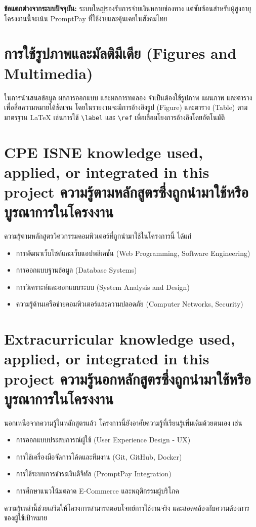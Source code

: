 \textbf{ข้อแตกต่างจากระบบปัจจุบัน:}  
ระบบใหญ่รองรับการจ่ายเงินหลายช่องทาง แต่ซับซ้อนสำหรับผู้สูงอายุ 
โครงงานนี้จะเน้น PromptPay ที่ใช้ง่ายและคุ้นเคยในสังคมไทย

\section{การใช้รูปภาพและมัลติมีเดีย (Figures and Multimedia)}
ในการนำเสนอข้อมูล ผลการออกแบบ และผลการทดลอง \cite{pressman2014} 
จำเป็นต้องใช้รูปภาพ แผนภาพ และตาราง เพื่อสื่อความหมายได้ชัดเจน 
โดยในรายงานจะมีการอ้างอิงรูป (Figure) และตาราง (Table) ตามมาตรฐาน {\LaTeX} 
เช่นการใช้ \verb.\label. และ \verb.\ref. เพื่อเชื่อมโยงการอ้างอิงโดยอัตโนมัติ

\section{\ifenglish%
\ifcpe CPE \else ISNE \fi knowledge used, applied, or integrated in this project
\else%
ความรู้ตามหลักสูตรซึ่งถูกนำมาใช้หรือบูรณาการในโครงงาน
\fi
}
ความรู้ตามหลักสูตรวิศวกรรมคอมพิวเตอร์ที่ถูกนำมาใช้ในโครงการนี้ ได้แก่
\begin{itemize}
    \item การพัฒนาเว็บไซต์และเว็บแอปพลิเคชัน (Web Programming, Software Engineering) \cite{pressman2014}
    \item การออกแบบฐานข้อมูล (Database Systems)
    \item การวิเคราะห์และออกแบบระบบ (System Analysis and Design)
    \item ความรู้ด้านเครือข่ายคอมพิวเตอร์และความปลอดภัย (Computer Networks, Security) \cite{pressman2014}
\end{itemize}

\section{\ifenglish%
Extracurricular knowledge used, applied, or integrated in this project
\else%
ความรู้นอกหลักสูตรซึ่งถูกนำมาใช้หรือบูรณาการในโครงงาน
\fi
}
นอกเหนือจากความรู้ในหลักสูตรแล้ว โครงการนี้ยังอาศัยความรู้ที่เรียนรู้เพิ่มเติมด้วยตนเอง เช่น
\begin{itemize}
    \item การออกแบบประสบการณ์ผู้ใช้ (User Experience Design - UX) \cite{pressman2014}
    \item การใช้เครื่องมือจัดการโค้ดและทีมงาน (Git, GitHub, Docker)
    \item การใช้ระบบการชำระเงินดิจิทัล (PromptPay Integration) \cite{promptpay2021}
    \item การศึกษาแนวโน้มตลาด E-Commerce และพฤติกรรมผู้บริโภค \cite{otop2020}
\end{itemize}
ความรู้เหล่านี้ช่วยเสริมให้โครงการสามารถตอบโจทย์การใช้งานจริง 
และสอดคล้องกับความต้องการของผู้ใช้เป้าหมาย
